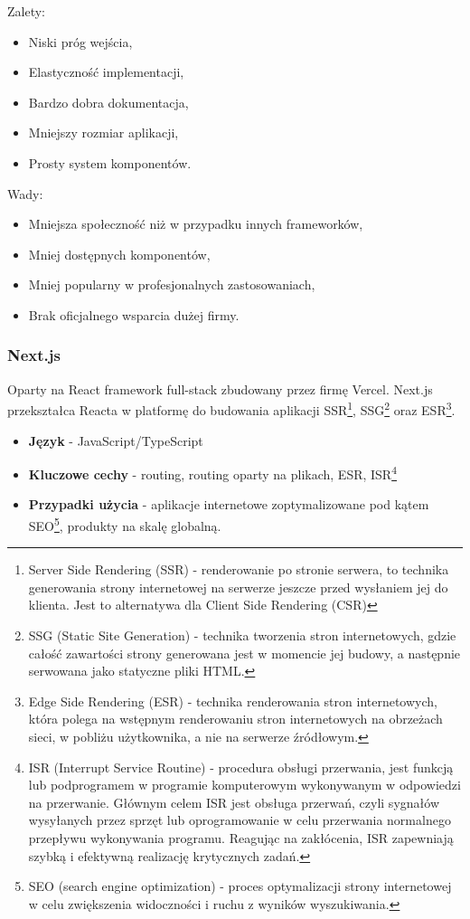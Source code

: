 Zalety:
\begin{itemize}
	\item Niski próg wejścia,
	\item Elastyczność implementacji,
	\item Bardzo dobra dokumentacja,
	\item Mniejszy rozmiar aplikacji,
	\item Prosty system komponentów.
\end{itemize}

Wady:
\begin{itemize}
	\item Mniejsza społeczność niż w przypadku innych frameworków,
	\item Mniej dostępnych komponentów,
	\item Mniej popularny w profesjonalnych zastosowaniach,
	\item Brak oficjalnego wsparcia dużej firmy.
\end{itemize}

\subsubsection{Next.js}
Oparty na React framework full-stack zbudowany przez firmę Vercel. Next.js przekształca Reacta w platformę do budowania aplikacji SSR\footnote{Server Side Rendering (SSR) - renderowanie po stronie serwera, to technika generowania strony internetowej na serwerze jeszcze przed wysłaniem jej do klienta. Jest to alternatywa dla Client Side Rendering (CSR)}, SSG\footnote{SSG (Static Site Generation) - technika tworzenia stron internetowych, gdzie całość zawartości strony generowana jest w momencie jej budowy, a następnie serwowana jako statyczne pliki HTML.} oraz ESR\footnote{Edge Side Rendering (ESR) - technika renderowania stron internetowych, która polega na wstępnym renderowaniu stron internetowych na obrzeżach sieci, w pobliżu użytkownika, a nie na serwerze źródłowym.}.

\begin{itemize}
	\item \textbf{Język} - JavaScript/TypeScript
	\item \textbf{Kluczowe cechy} - routing, routing oparty na plikach, ESR, ISR\footnote{ISR (Interrupt Service Routine) - procedura obsługi przerwania, jest funkcją lub podprogramem w programie komputerowym wykonywanym w odpowiedzi na przerwanie. Głównym celem ISR jest obsługa przerwań, czyli sygnałów wysyłanych przez sprzęt lub oprogramowanie w celu przerwania normalnego przepływu wykonywania programu. Reagując na zakłócenia, ISR zapewniają szybką i efektywną realizację krytycznych zadań.}
	\item \textbf{Przypadki użycia} - aplikacje internetowe zoptymalizowane pod kątem SEO\footnote{SEO (search engine optimization) - proces optymalizacji strony internetowej w celu zwiększenia widoczności i ruchu z wyników wyszukiwania.}, produkty na skalę globalną.
\end{itemize}

